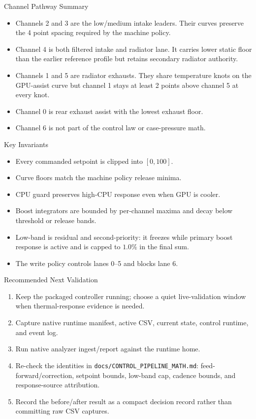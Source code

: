 \documentclass[aspectratio=169]{beamer}
\newcommand{\cfg}{\texttt}
\begin{document}
\begin{frame}{Channel Pathway Summary}
  \begin{itemize}
    \item Channels 2 and 3 are the low/medium intake leaders. Their curves
      preserve the 4 point spacing required by the machine policy.
    \item Channel 4 is both filtered intake and radiator lane. It carries
      lower static floor than the earlier reference profile but retains
      secondary radiator authority.
    \item Channels 1 and 5 are radiator exhausts. They share temperature knots
      on the GPU-assist curve but channel 1 stays at least 2 points above
      channel 5 at every knot.
    \item Channel 0 is rear exhaust assist with the lowest exhaust floor.
    \item Channel 6 is not part of the control law or case-pressure math.
  \end{itemize}
\end{frame}

\begin{frame}{Key Invariants}
  \begin{itemize}
    \item Every commanded setpoint is clipped into $[0,100]$.
    \item Curve floors match the machine policy release minima.
    \item CPU guard preserves high-CPU response even when GPU is cooler.
    \item Boost integrators are bounded by per-channel maxima and decay below
      threshold or release bands.
    \item Low-band is residual and second-priority: it freezes while primary
      boost response is active and is capped to $1.0\%$ in the final sum.
    \item The write policy controls lanes 0--5 and blocks lane 6.
  \end{itemize}
\end{frame}

\begin{frame}{Recommended Next Validation}
  \begin{enumerate}
    \item Keep the packaged controller running; choose a quiet live-validation
      window when thermal-response evidence is needed.
    \item Capture native runtime manifest, active CSV, current state,
      control runtime, and event log.
    \item Run native analyzer ingest/report against the runtime home.
    \item Re-check the identities in \cfg{docs/CONTROL\_PIPELINE\_MATH.md}:
      feed-forward/correction, setpoint bounds, low-band cap, cadence bounds,
      and response-source attribution.
    \item Record the before/after result as a compact decision record rather
      than committing raw CSV captures.
  \end{enumerate}
\end{frame}
\end{document}
